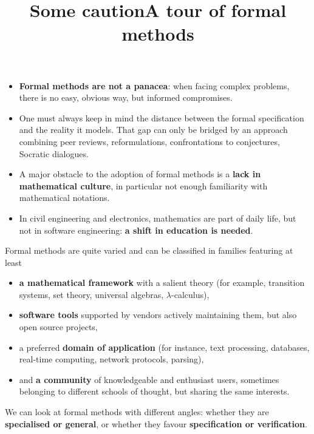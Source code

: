 \documentclass[wide]{slides}
\begin{document}
\begin{slide}
  \title{Some caution}

  \begin{itemize}

    \item \textbf{Formal methods are not a panacea}: when facing
      complex problems, there is no easy, obvious way, but informed
      compromises.

    \item One must always keep in mind the distance between the formal
      specification and the reality it models. That gap can only be
      bridged by an approach combining peer reviews, reformulations,
      confrontations to conjectures, Socratic dialogues.

    \item A major obstacle to the adoption of formal methods is a
      \textbf{lack in mathematical culture}, in particular not enough
      familiarity with mathematical notations.

    \item In civil engineering and electronics, mathematics are part
      of daily life, but not in software engineering: \textbf{a shift
        in education is needed}.

  \end{itemize}
\end{slide}

\begin{slide}
  \title{A tour of formal methods}

  Formal methods are quite varied and can be classified in families
  featuring at least
  \begin{itemize}

    \item \textbf{a mathematical framework} with a salient theory (for
      example, transition systems, set theory, universal algebras,
      $\lambda$-calculus),

    \item \textbf{software tools} supported by vendors actively
      maintaining them, but also open source projects,

    \item a preferred \textbf{domain of application} (for instance,
      text processing, databases, real-time computing, network
      protocols, parsing),

    \item and \textbf{a community} of knowledgeable and enthusiast
      users, sometimes belonging to different schools of thought, but
      sharing the same interests.

  \end{itemize}
  We can look at formal methods with different angles: whether they
  are \textbf{specialised or general}, or whether they favour
  \textbf{specification or verification}.

\end{slide}
\end{document}
